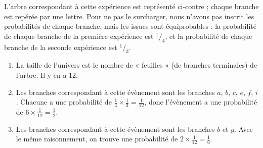 \documentclass[11pt]{article}
\begin{document}
\begin{exercice}
\begin{multicols}{2}
\begin{center}
    \end{center}

    L'arbre correspondant à cette expérience est représenté ci-contre ; chaque branche est repérée par une lettre. Pour ne pas le surcharger, nous n'avons pas inscrit les probabilités de chaque branche, mais les issues sont équiprobables : la probabilité de chaque branche de la première expérience est $^1/_4$, et la probabilité de chaque branche de la seconde expérience est $^1/_3$.
  \end{multicols}

  \begin{enumerate}
    \item La taille de l'univers est le nombre de « feuilles » (de branches terminales) de l'arbre. Il y en a 12.
    \item Les branches correspondant à cette évènement sont les branches $a$, $b$, $c$, $e$, $f$, $i$. Chacune a une probabilité de $\frac{1}{4}\times\frac{1}{3}=\frac{1}{12}$, donc l'évènement a une probabilité de $6\times\frac{1}{12}=\frac{1}{2}$.
    \item Les branches correspondant à cette évènement sont les branches $b$ et $g$. Avec le même raisonnement, on trouve une probabilité de $2\times\frac{1}{12}=\frac{1}{6}$.
  \end{enumerate}
\end{exercice}
\end{document}
